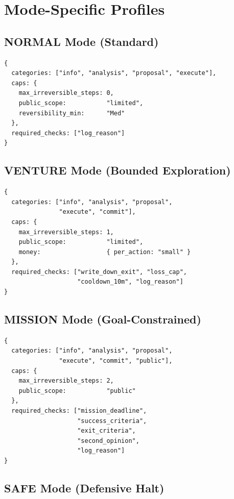 \section{Mode-Specific Profiles}
\label{sec:a-allowed-mode-profiles}

\subsection{NORMAL Mode (Standard)}

\begin{lstlisting}[basicstyle=\ttfamily\small,frame=single]
{
  categories: ["info", "analysis", "proposal", "execute"],
  caps: {
    max_irreversible_steps: 0,
    public_scope:           "limited",
    reversibility_min:      "Med"
  },
  required_checks: ["log_reason"]
}
\end{lstlisting}

\subsection{VENTURE Mode (Bounded Exploration)}

\begin{lstlisting}[basicstyle=\ttfamily\small,frame=single]
{
  categories: ["info", "analysis", "proposal",
               "execute", "commit"],
  caps: {
    max_irreversible_steps: 1,
    public_scope:           "limited",
    money:                  { per_action: "small" }
  },
  required_checks: ["write_down_exit", "loss_cap",
                    "cooldown_10m", "log_reason"]
}
\end{lstlisting}

\subsection{MISSION Mode (Goal-Constrained)}

\begin{lstlisting}[basicstyle=\ttfamily\small,frame=single]
{
  categories: ["info", "analysis", "proposal",
               "execute", "commit", "public"],
  caps: {
    max_irreversible_steps: 2,
    public_scope:           "public"
  },
  required_checks: ["mission_deadline",
                    "success_criteria",
                    "exit_criteria",
                    "second_opinion",
                    "log_reason"]
}
\end{lstlisting}

\subsection{SAFE Mode (Defensive Halt)}

